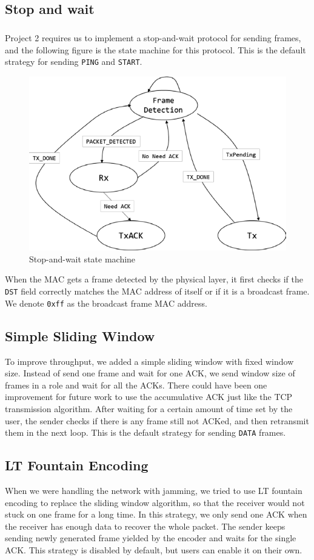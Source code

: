     \subsection{Stop and wait}
        \subparagraph{}
        Project 2 requires us to implement a stop-and-wait protocol for sending frames, and the following figure is the state machine for this protocol. This is the default strategy for sending {\tt PING} and {\tt START}.

        \begin{figure}[!h]
	        \centering
	        \includegraphics[width=0.5\linewidth]{sections/a.png}
	    \caption{Stop-and-wait state machine}
        \end{figure}
        
        When the MAC gets a frame detected by the physical layer, it first checks if the {\tt DST} field correctly matches the MAC address of itself or if it is a broadcast frame. We denote {\tt 0xff} as the broadcast frame MAC address.

    \subsection{Simple Sliding Window}
        To improve throughput, we added a simple sliding window with fixed window size. Instead of send one frame and wait for one ACK, we send window size of frames in a role and wait for all the ACKs. There could have been one improvement for future work to use the accumulative ACK just like the TCP transmission algorithm. After waiting for a certain amount of time set by the user, the sender checks if there is any frame still not ACKed, and then retransmit them in the next loop. This is the default strategy for sending {\tt DATA} frames.

    \subsection{LT Fountain Encoding}
        When we were handling the network with jamming, we tried to use LT fountain encoding to replace the sliding window algorithm, so that the receiver would not stuck on one frame for a long time. In this strategy, we only send one ACK when the receiver has enough data to recover the whole packet. The sender keeps sending newly generated frame yielded by the encoder and waits for the single ACK. This strategy is disabled by default, but users can enable it on their own.

